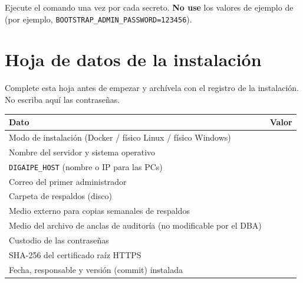 
Ejecute el comando una vez por cada secreto. \textbf{No use} los valores de ejemplo de
 (por ejemplo, \texttt{BOOTSTRAP\_ADMIN\_PASSWORD=123456}).

\section{Hoja de datos de la instalación}

Complete esta hoja antes de empezar y archívela con el registro de la instalación. No escriba
aquí las contraseñas.

\begin{xltabular}{\linewidth}{@{}l X@{}}
	\toprule
	\textbf{Dato} & \textbf{Valor} \\
	\midrule
	\endhead
	Modo de instalación (Docker / físico Linux / físico Windows) & \\
	Nombre del servidor y sistema operativo & \\
	\texttt{DIGAIPE\_HOST} (nombre o IP para las PCs) & \\
	Correo del primer administrador & \\
	Carpeta de respaldos (disco) & \\
	Medio externo para copias semanales de respaldos & \\
	Medio del archivo de anclas de auditoría (no modificable por el DBA) & \\
	Custodio de las contraseñas & \\
	SHA-256 del certificado raíz HTTPS & \\
	Fecha, responsable y versión (commit) instalada & \\
	\bottomrule
\end{xltabular}
